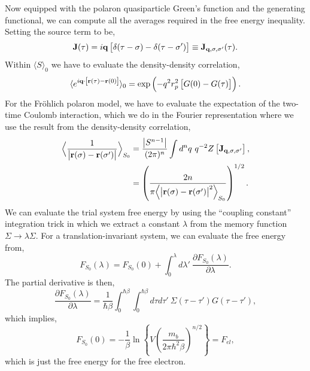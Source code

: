 Now equipped with the polaron quasiparticle Green's function and the generating functional, we can compute all the averages required in the free energy inequality. Setting the source term to be,
\begin{equation}
    \vb{J}(\tau) = i \vb{q} \left[ \delta(\tau - \sigma) - \delta(\tau - \sigma') \right] \equiv \vb{J}_{\vb{q}, \sigma, \sigma'}(\tau).
\end{equation}
Within $\langle S \rangle_{0}$ we have to evaluate the density-density correlation,
\begin{equation}
    \langle e^{i \vb{q} \cdot \left[ \vb{r}(\tau) - \vb{r}(0) \right]}\rangle_0  = \exp \left( -q^2 r_p^2 \left[ G(0) - G(\tau) \right] \right).
\end{equation}
For the Fr\"ohlich polaron model, we have to evaluate the expectation of the two-time Coulomb interaction, which we do in the Fourier representation where we use the result from the density-density correlation,
\begin{equation}
    \begin{aligned}
        \Big\langle \frac{1}{\abs{\vb{r}(\sigma) - \vb{r}(\sigma')}} \Big\rangle_{S_0} &= \frac{\abs{S^{n-1}}}{(2\pi)^n} \int d^n q\ q^{-2} Z\left[ \vb{J}_{\vb{q}, \sigma, \sigma'} \right], \\
        &= \left(\frac{2 n}{\pi \Big\langle \abs{\vb{r}(\sigma) - \vb{r}(\sigma')}^2 \Big\rangle_{S_0}}\right)^{1/2}.
    \end{aligned}
\end{equation}
We can evaluate the trial system free energy by using the ``coupling constant'' integration trick in which we extract a constant $\lambda$ from the memory function $\Sigma \to \lambda \Sigma$. For a translation-invariant system, we can evaluate the free energy from,
\begin{equation}
    F_{S_0}(\lambda) = F_{S_0}(0) + \int_0^\lambda d\lambda'\ \frac{\partial F_{S_0}(\lambda)}{\partial \lambda}.
\end{equation}
The partial derivative is then,
\begin{equation}
    \frac{\partial F_{S_0}(\lambda)}{\partial \lambda} = \frac{1}{\hbar\beta} \int_0^{\hbar\beta} \int_0^{\hbar\beta} d\tau d\tau'\ \Sigma(\tau - \tau') G(\tau - \tau'),
\end{equation}
which implies,
\begin{equation}
    F_{S_0}(0) = -\frac{1}{\beta} \ln\left\{V \left( \frac{m_b}{2 \pi \hbar^2 \beta} \right)^{n/2}\right\} = F_{el},
\end{equation}
which is just the free energy for the free electron.


